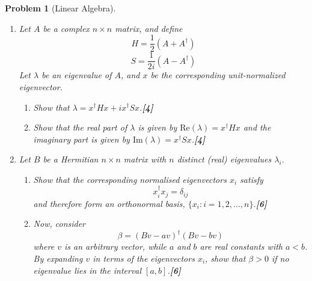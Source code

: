 \documentclass[a4paper]{article}
\theoremstyle{new}
\newtheorem{qns}{Problem}[section]
\begin{document}
\newpage
\begin{qns}[Linear Algebra]\leavevmode
\begin{enumerate}[label=(\roman*)]
\item Let $A$ be a complex $n\times n$ matrix, and define
$$H=\frac{1}{2}(A+A^\dag)$$
$$S=\frac{1}{2i}(A-A^\dag)$$
Let $\lambda$ be an eigenvalue of $A$, and $x$ be the corresponding unit-normalized eigenvector.
\begin{enumerate}[label=(\alph*)]
\item Show that $\lambda=x^\dag Hx+ix^\dag Sx$.\hfill \textbf{[4]}
\item Show that the real part of $\lambda$ is given by $\text{Re}(\lambda)=x^\dag Hx$ and the imaginary part is given by $\text{Im}(\lambda)=x^\dag Sx$.\hfill \textbf{[4]}
\end{enumerate}
\item Let $B$ be a Hermitian $n\times n$ matrix with $n$ distinct (real) eigenvalues $\lambda_i$.
\begin{enumerate}[label=(\alph*)]
\item Show that the corresponding normalised eigenvectors $x_i$ satisfy
$$x_i^\dag x_j=\delta_{ij}$$
and therefore form an orthonormal basis, $\{x_i:i=1,2,...,n\}$.\hfill \textbf{[6]}
\item Now, consider
$$\beta=(Bv-av)^\dag(Bv-bv)$$
where $v$ is an arbitrary vector, while $a$ and $b$ are real constants with $a < b$. By expanding $v$ in terms of the eigenvectors $x_i$, show that $\beta>0$ if no eigenvalue lies in the interval $[a, b]$.\hfill \textbf{[6]}
\end{enumerate}
\end{enumerate}
\end{qns}
\end{document}
